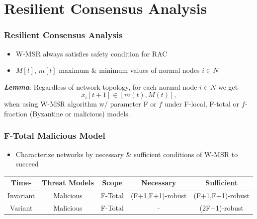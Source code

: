 \documentclass{beamer}
\begin{document}
\section{Resilient Consensus Analysis}

\begin{frame}
\frametitle{Resilient Consensus Analysis}
\begin{itemize}
\item W-MSR always satisfies safety condition for RAC 
\item $M[t]$, $m[t]$ maximum \& minimum values of normal nodes $i \in N$ \vspace{.2cm}
\end{itemize}

\textbf{\textit{Lemma}}: Regardless of network topology, for each normal node $i \in N$ we get
\begin{equation*}
x_i[t+1] \in [m(t),M(t)],
\end{equation*}
when using W-MSR algorithm w/ parameter F or $f$ under F-local, F-total or $f$-fraction (Byzantine or malicious) models.
\end{frame}

\begin{frame}
\frametitle{F-Total Malicious Model}
\begin{itemize}
\item Characterize networks by necessary \& sufficient conditions of W-MSR to succeed
\end{itemize}
\begin{table}
\centering
\begin{tabular}{|c|c|c|c|c|}
\hline \scriptsize{\textbf{Time-}} &\scriptsize{\textbf{Threat Models}} &  \scriptsize{\textbf{Scope}} & \scriptsize{\textbf{Necessary}} & \scriptsize{\textbf{Sufficient}} \\
\hline \scriptsize{Invariant} &\scriptsize{Malicious} & \scriptsize{F-Total}  & \scriptsize{(F+1,F+1)-robust} & \scriptsize{(F+1,F+1)-robust} \\
\hline \scriptsize{Variant} &\scriptsize{Malicious} & \scriptsize{F-Total}  & \scriptsize{-} & \scriptsize{(2F+1)-robust}  \\
\hline
\end{tabular}
\end{table}
\end{frame}
\end{document}

